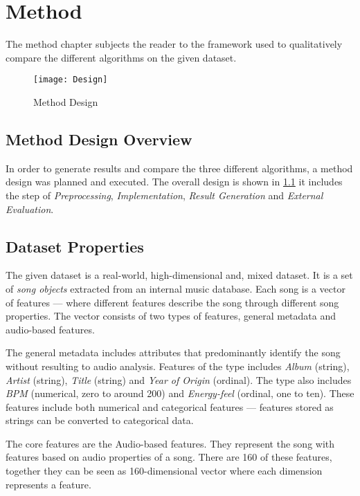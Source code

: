 \documentclass[../report.tex]{subfiles}
\begin{document}
 \chapter{Method} The method chapter subjects the reader to the framework used to qualitatively compare the different algorithms on the given dataset.

\begin{figure}[h]
  \begin{center}
    \texttt{[image: Design]}
  \end{center}
  \caption{Method Design}\label{fig:method}
\end{figure}
\section{Method Design Overview}
In order to generate results and compare the three different algorithms, a method design was planned and executed. The overall design is shown in \cref{fig:method} it includes the step of \textit{Preprocessing}, \textit{Implementation}, \textit{Result Generation} and \textit{External Evaluation}.

\section{Dataset Properties}
The given dataset is a real-world, high-dimensional and, mixed dataset. It is a set of \textit{song objects} extracted from an internal music database. Each song is a vector of features --- where different features describe the song through different song properties. The vector consists of two types of features, general metadata and audio-based features.

The general metadata includes attributes that predominantly identify the song without resulting to audio analysis. Features of the type includes \textit{Album} (string), \textit{Artist} (string), \textit{Title} (string) and \textit{Year of Origin} (ordinal). The type also includes \textit{BPM} (numerical, zero to around 200) and \textit{Energy-feel} (ordinal, one to ten). These features include both numerical and categorical features --- features stored as strings can be converted to categorical data.

The core features are the Audio-based features. They represent the song with features based on audio properties of a song. There are 160 of these features, together they can be seen as 160-dimensional vector where each dimension represents a feature.
\end{document}
